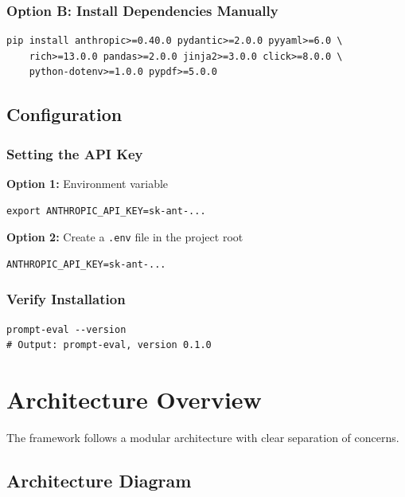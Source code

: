 \documentclass[11pt,a4paper]{report}
\begin{document}
\subsection{Option B: Install Dependencies Manually}

\begin{lstlisting}[style=bash]
pip install anthropic>=0.40.0 pydantic>=2.0.0 pyyaml>=6.0 \
    rich>=13.0.0 pandas>=2.0.0 jinja2>=3.0.0 click>=8.0.0 \
    python-dotenv>=1.0.0 pypdf>=5.0.0
\end{lstlisting}

\section{Configuration}

\subsection{Setting the API Key}

\textbf{Option 1:} Environment variable
\begin{lstlisting}[style=bash]
export ANTHROPIC_API_KEY=sk-ant-...
\end{lstlisting}

\textbf{Option 2:} Create a \texttt{.env} file in the project root
\begin{lstlisting}
ANTHROPIC_API_KEY=sk-ant-...
\end{lstlisting}

\subsection{Verify Installation}

\begin{lstlisting}[style=bash]
prompt-eval --version
# Output: prompt-eval, version 0.1.0
\end{lstlisting}


\chapter{Architecture Overview}

The framework follows a modular architecture with clear separation of concerns.

\section{Architecture Diagram}
\end{document}
